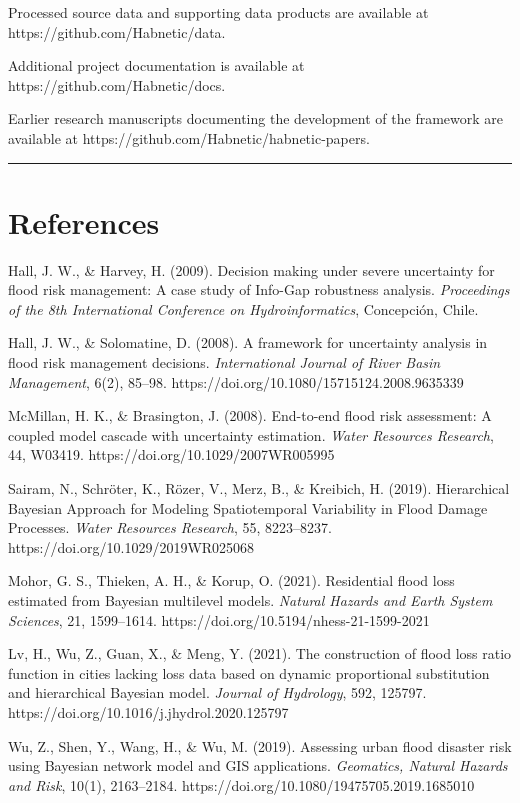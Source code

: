 \documentclass[
]{article}
\begin{document}
Processed source data and supporting data products are available at
https://github.com/Habnetic/data.

Additional project documentation is available at
https://github.com/Habnetic/docs.

Earlier research manuscripts documenting the development of the
framework are available at https://github.com/Habnetic/habnetic-papers.

\begin{center}\rule{0.5\linewidth}{0.5pt}\end{center}

\section{References}\label{references}

Hall, J. W., \& Harvey, H. (2009). Decision making under severe
uncertainty for flood risk management: A case study of Info-Gap
robustness analysis. \emph{Proceedings of the 8th International
Conference on Hydroinformatics}, Concepción, Chile.

Hall, J. W., \& Solomatine, D. (2008). A framework for uncertainty
analysis in flood risk management decisions. \emph{International Journal
of River Basin Management}, 6(2), 85--98.
https://doi.org/10.1080/15715124.2008.9635339

McMillan, H. K., \& Brasington, J. (2008). End-to-end flood risk
assessment: A coupled model cascade with uncertainty estimation.
\emph{Water Resources Research}, 44, W03419.
https://doi.org/10.1029/2007WR005995

Sairam, N., Schröter, K., Rözer, V., Merz, B., \& Kreibich, H. (2019).
Hierarchical Bayesian Approach for Modeling Spatiotemporal Variability
in Flood Damage Processes. \emph{Water Resources Research}, 55,
8223--8237. https://doi.org/10.1029/2019WR025068

Mohor, G. S., Thieken, A. H., \& Korup, O. (2021). Residential flood
loss estimated from Bayesian multilevel models. \emph{Natural Hazards
and Earth System Sciences}, 21, 1599--1614.
https://doi.org/10.5194/nhess-21-1599-2021

Lv, H., Wu, Z., Guan, X., \& Meng, Y. (2021). The construction of flood
loss ratio function in cities lacking loss data based on dynamic
proportional substitution and hierarchical Bayesian model. \emph{Journal
of Hydrology}, 592, 125797.
https://doi.org/10.1016/j.jhydrol.2020.125797

Wu, Z., Shen, Y., Wang, H., \& Wu, M. (2019). Assessing urban flood
disaster risk using Bayesian network model and GIS applications.
\emph{Geomatics, Natural Hazards and Risk}, 10(1), 2163--2184.
https://doi.org/10.1080/19475705.2019.1685010
\end{document}

